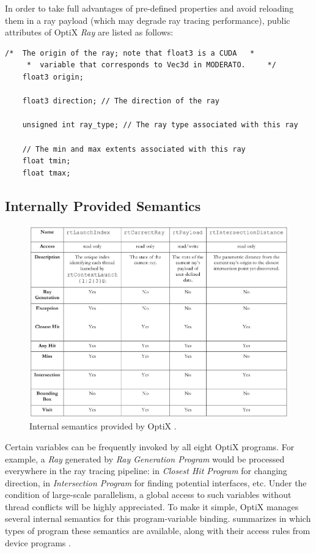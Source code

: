 In order to take full advantages of pre-defined properties and avoid reloading them in a ray payload (which may degrade ray tracing performance), public attributes of OptiX \textit{Ray} are listed as follows:
\begin{lstlisting}[mathescape]
    /*	The origin of the ray; note that float3 is a CUDA	*  
     *	variable that corresponds to Vec3d in MODERATO.		*/
    float3 origin;
    
    float3 direction; // The direction of the ray
    
    unsigned int ray_type; // The ray type associated with this ray
    
    // The min and max extents associated with this ray
    float tmin;
    float tmax;
\end{lstlisting}


\subsection{Internally Provided Semantics}
\begin{figure}[htbp]
		\includegraphics[width=\textwidth,height=\textheight,keepaspectratio]{Figures/semantics.png}
	\caption[Internal semantics provided by OptiX]{Internal semantics provided by OptiX \citep{Reference6}.}%
	\label{fig:semantics}
\end{figure}
Certain variables can be frequently invoked by all eight OptiX programs. For example, a \textit{Ray} generated by \textit{Ray Generation Program} would be processed everywhere in the ray tracing pipeline: in \textit{Closest Hit Program} for changing direction, in \textit{Intersection Program} for finding potential interfaces, etc. Under the condition of large-scale parallelism, a global access to such variables without thread conflicts will be highly appreciated. To make it simple, OptiX manages several internal semantics for this program-variable binding.  summarizes in which types of program these semantics are available, along with their access rules from device programs \citep{optixref}.

